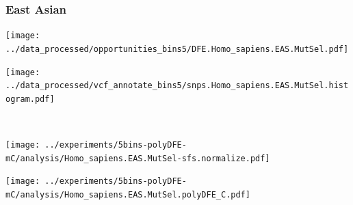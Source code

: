\subsubsection{East Asian}

\begin{minipage}{0.49\linewidth}
    \texttt{[image: ../data\_processed/opportunities\_bins5/DFE.Homo\_sapiens.EAS.MutSel.pdf]}
\end{minipage}
\begin{minipage}{0.49\linewidth}
    \texttt{[image: ../data\_processed/vcf\_annotate\_bins5/snps.Homo\_sapiens.EAS.MutSel.histogram.pdf]}
\end{minipage}
\\
\begin{minipage}{0.49\linewidth}
    \texttt{[image: ../experiments/5bins-polyDFE-mC/analysis/Homo\_sapiens.EAS.MutSel-sfs.normalize.pdf]}
\end{minipage}
\begin{minipage}{0.4\linewidth}
    \texttt{[image: ../experiments/5bins-polyDFE-mC/analysis/Homo\_sapiens.EAS.MutSel.polyDFE\_C.pdf]}
\end{minipage}
